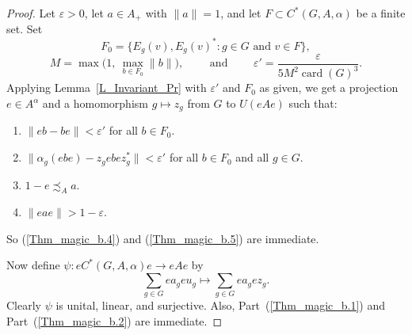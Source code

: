 \documentclass[10pt]{amsart}
\newcounter{TmpEnumi}
\numberwithin{equation}{section}
\theoremstyle{definition}
\newcommand{\af}{\alpha}
\newcommand{\ep}{\varepsilon}
\newcommand{\card}{{\operatorname{card}}}
\newcommand{\hm}{homomorphism}
\newcommand{\CGAa}{C^* (G, A, \af)}
\newcommand{\Lem}[1]{Lemma~\ref{#1}}
\begin{document}
\begin{proof}
Let $\ep > 0$, let $a \in A_+$ with $\| a \|=1$, 
and let $F \subset \CGAa$ be a finite set.
Set 
\[
F_0= \Big\{ E_g (v), E_g (v)^* \colon g \in G \mbox{ and }  v \in F \Big\},
\]
\[
M= \max \Big( 1,\ \max_{b \in F_0} \| b \|  \Big),
\qquad
\mbox{ and }
\qquad
\ep'= \frac{\ep}{5 M^2 \card (G)^3}.
\]  
Applying \Lem{L_Invariant_Pr} with $\ep'$ and 
 $F_0$ as given,
we get a projection $e \in A^{\alpha}$ and
a \hm{} $g \mapsto z_g$
from $G$ to $U (e A e)$ such that:
\begin{enumerate}
\setcounter{enumi}{\value{TmpEnumi}}
%
\item \label{Tr_Ap_in.a}
$\| eb - be \| < \ep' $ for all $b \in F_0$.
\item \label{Tr_Ap_in.b}
$\| \alpha_g (ebe) - z_g ebe z^*_g\|< \ep'$ for all $b \in F_0$ and all $g \in G$.
\item \label{Tr_Ap_in.d}
$1-e \precsim_A a$.
\item \label{Tr_Ap_in.e}
$\| eae\| > 1 - \ep$.
%
\setcounter{TmpEnumi}{\value{enumi}}
\end{enumerate} 
So (\ref{Thm_magic_b.4}) and (\ref{Thm_magic_b.5}) are immediate. 

Now define $\psi \colon e \CGAa e \to e A e$ by 
\[
\sum_{g \in G} e a_g e u_g \mapsto \sum_{g \in G } e a_g e z_g .
\]
Clearly $\psi$ is unital, linear, and surjective. Also, Part~(\ref{Thm_magic_b.1}) and Part~(\ref{Thm_magic_b.2}) are immediate. 
 

\end{proof}
\end{document}
